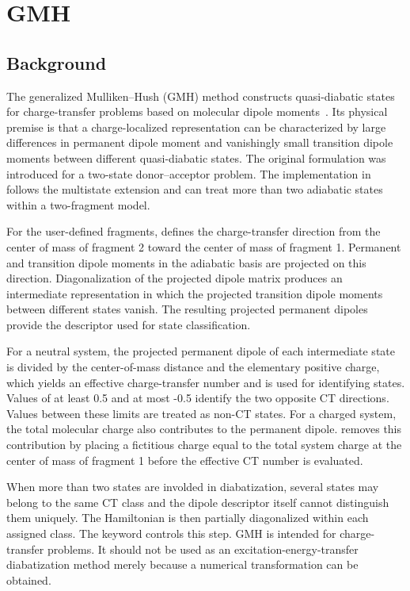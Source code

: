 \section{GMH}\label{sec-gmh}
\subsection{Background}
The generalized Mulliken--Hush (GMH) method constructs quasi-diabatic states for charge-transfer problems based on molecular dipole moments~\cite{Cave-CPL-1996-p15,Yang-JCP-2013-p154104}. Its physical premise is that a charge-localized representation can be characterized by large differences in permanent dipole moment and vanishingly small transition dipole moments between different quasi-diabatic states. The original formulation was introduced for a two-state donor--acceptor problem. The implementation in \progname{} follows the multistate extension and can treat more than two adiabatic states within a two-fragment model.

For the user-defined fragments, \progname{} defines the charge-transfer direction from the center of mass of fragment 2 toward the center of mass of fragment 1. Permanent and transition dipole moments in the adiabatic basis are projected on this direction. Diagonalization of the projected dipole matrix produces an intermediate representation in which the projected transition dipole moments between different states vanish. The resulting projected permanent dipoles provide the descriptor used for state classification.

For a neutral system, the projected permanent dipole of each intermediate state is divided by the center-of-mass distance and the elementary positive charge, which yields an effective charge-transfer number and is used for identifying states. Values of at least 0.5 and at most -0.5 identify the two opposite CT directions. Values between these limits are treated as non-CT states. For a charged system, the total molecular charge also contributes to the permanent dipole. \progname{} removes this contribution by placing a fictitious charge equal to the total system charge at the center of mass of fragment 1 before the effective CT number is evaluated.

When more than two states are involded in diabatization, several states may belong to the same CT class and the dipole descriptor itself cannot distinguish them uniquely. The Hamiltonian is then partially diagonalized within each assigned class. The  keyword controls this step. GMH is intended for charge-transfer problems. It should not be used as an excitation-energy-transfer diabatization method merely because a numerical transformation can be obtained.

